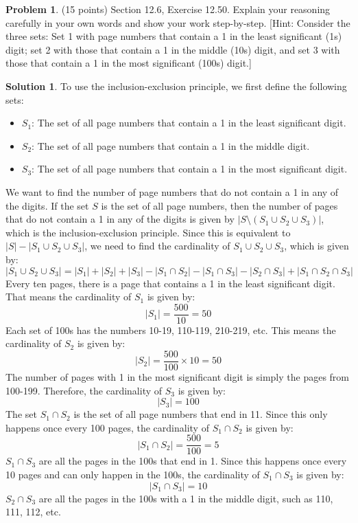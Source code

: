 \documentclass{article}
\theoremstyle{definition}
\newtheorem{problem}{Problem}
\newtheorem*{solution}{Solution}
\begin{document}
\newpage
\begin{problem} (15 points) Section 12.6, Exercise 12.50.  Explain your reasoning
carefully in your own words and show your work step-by-step.
[Hint: Consider the three sets: Set 1 with page numbers that contain a 1 in the least 
significant (1s) digit; set 2 with those that contain a 1 in the middle (10s) digit, and 
set 3 with those that contain a 1 in the most significant (100s) digit.]
\end{problem}
\begin{solution}
To use the inclusion-exclusion principle, we first define the following sets:
\begin{itemize}
  \item $S_1$: The set of all page numbers that contain a 1 in the least significant digit.
  \item $S_2$: The set of all page numbers that contain a 1 in the middle digit.
  \item $S_3$: The set of all page numbers that contain a 1 in the most significant digit.
\end{itemize}
We want to find the number of page numbers that do not contain a 1 in any of the digits.
If the set $S$ is the set of all page numbers, then the number of pages that do not contain a 1 in any of the digits is given by 
$|S \setminus (S_1 \cup S_2 \cup S_3)|$, which is the inclusion-exclusion principle.
Since this is equivalent to $ |S| - |S_1 \cup S_2 \cup S_3| $, we need to find the cardinality of $S_1 \cup S_2 \cup S_3$, which is given by:
$$ |S_1 \cup S_2 \cup S_3| = |S_1| + |S_2| + |S_3| - |S_1 \cap S_2| - |S_1 \cap S_3| - |S_2 \cap S_3| + |S_1 \cap S_2 \cap S_3| $$
Every ten pages, there is a page that contains a 1 in the least significant digit.
That means the cardinality of $S_1$ is given by:
$$ |S_1| = \frac{500}{10} = 50 $$
Each set of 100s has the numbers 10-19, 110-119, 210-219, etc.
This means the cardinality of $S_2$ is given by:
$$ |S_2| = \frac{500}{100} \times 10 = 50 $$
The number of pages with 1 in the most significant digit is simply the pages from 100-199.
Therefore, the cardinality of $S_3$ is given by:
$$ |S_3| = 100 $$
The set $S_1 \cap S_2$ is the set of all page numbers that end in 11.
Since this only happens once every 100 pages, the cardinality of $S_1 \cap S_2$ is given by:
$$ |S_1 \cap S_2| = \frac{500}{100} = 5 $$
$S_1 \cap S_3$ are all the pages in the 100s that end in 1.
Since this happens once every 10 pages and can only happen in the 100s, the cardinality of $S_1 \cap S_3$ is given by:
$$ |S_1 \cap S_3| = 10 $$
$S_2 \cap S_3$ are all the pages in the 100s with a 1 in the middle digit, such as 110, 111, 112, etc.

\end{solution}
\end{document}
